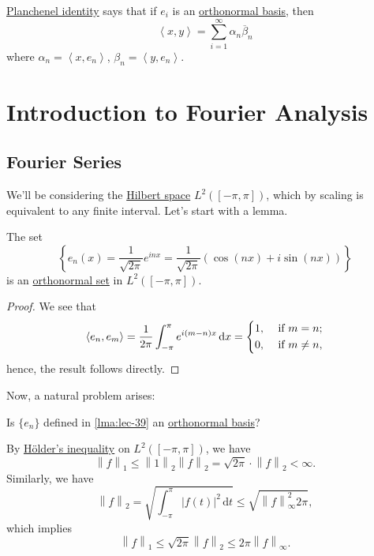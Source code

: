 \begin{prev}
	\hyperref[note:Planchenel-identity]{Planchenel identity}  says that if \(e_{i} \) is an \hyperref[def:orthonormal-basis]{orthonormal basis},
	then
	\[
		\left< x, y \right> = \sum_{i=1}^{\infty} \alpha _{n} \overline{\beta} _n
	\]
	where \(\alpha _n = \left< x, e_{n}  \right> \), \(\beta _n = \left< y, e_{n}  \right> \).
\end{prev}

\chapter{Introduction to Fourier Analysis}\label{ch:Introduction-to-Fourier-Analysis}
\section{Fourier Series}
We'll be considering the \hyperref[def:Hilbert-space]{Hilbert space} \(L^2([-\pi , \pi ])\), which by scaling is equivalent to
any finite interval. Let's start with a lemma.
\begin{lemma}\label{lma:lec-39}
	The set
	\[
		\left\{e_{n} (x) = \frac{1}{\sqrt{2\pi } }e^{inx} = \frac{1}{\sqrt{2\pi }}\left(\cos (nx) + i\sin (nx)\right)\right\}
	\]
	is an \hyperref[def:orthonormal-set]{orthonormal set} in \(L^2([-\pi , \pi ])\).
\end{lemma}
\begin{proof}
	We see that
	\[
		\left< e_{n} , e_{m}  \right> = \frac{1}{2\pi } \int_{-\pi}^{\pi } e^{i(m-n)x} \,\mathrm{d}x = \begin{dcases}
			1, & \text{ if } m = n ;    \\
			0, & \text{ if } m \neq n ,
		\end{dcases}
	\]
	hence, the result follows directly.
\end{proof}

Now, a natural problem arises:
\begin{problem}
Is \(\{e_{n} \}\) defined in \autoref{lma:lec-39} an \hyperref[def:orthonormal-basis]{orthonormal basis}?
\end{problem}
\begin{answer}
	By \hyperref[thm:Holder-inequality]{Hölder's inequality} on \(L^{2} ([-\pi , \pi ])\), we have
	\[
		\left\lVert f\right\rVert _1 \leq \left\lVert 1\right\rVert _2 \left\lVert f\right\rVert _2 = \sqrt{2\pi } \cdot \left\lVert f\right\rVert _2 < \infty .
	\]
	Similarly, we have
	\[
		\left\lVert f\right\rVert _2 = \sqrt{\int_{-\pi}^{\pi} \left\vert f(t) \right\vert ^{2} \,\mathrm{d}t} \leq \sqrt{\left\lVert f\right\rVert ^{2} _\infty 2\pi },
	\]
	which implies
	\[
		\left\lVert f\right\rVert _1 \leq \sqrt{2\pi } \left\lVert f\right\rVert _2 \leq 2\pi \left\lVert f\right\rVert _\infty .
	\]
\end{answer}


